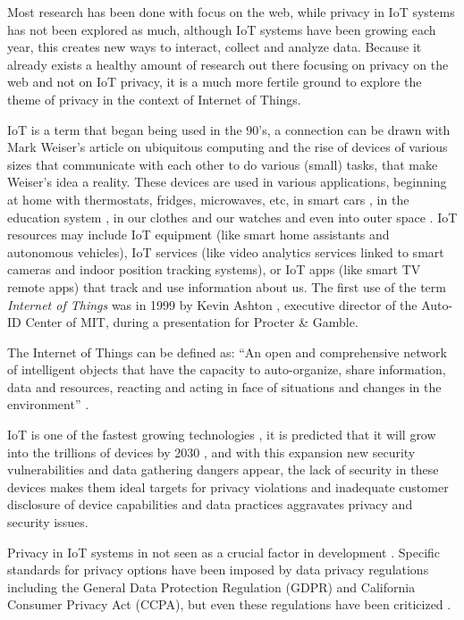 \documentclass[conference]{IEEEtran}
\begin{document}
Most research has been done with focus on the web, while privacy in IoT systems
has not been explored as much, although IoT systems have been growing each
year, this creates new ways to interact, collect and analyze data. Because
it already exists a healthy amount of research out there focusing on privacy
on the web and not on IoT privacy, it is a much more fertile ground to explore
the theme of privacy in the context of Internet of Things.

IoT is a term that began being used in the 90's, a connection can be drawn
with Mark Weiser's article on ubiquitous computing \cite{weiser1991computer}
and the rise of devices of various sizes that communicate with each other to
do various (small) tasks, that make Weiser's idea a reality. These devices are
used in various applications, beginning at home \cite{marikyan2019systematic}
with thermostats, fridges, microwaves, etc, in smart cars \cite{arena2020overview},
in the education system \cite{al2020survey}, in our clothes and our watches \cite{niknejad2020comprehensive}
and even into outer space \cite{AkyildizInternet}. IoT resources may include IoT
equipment (like smart home assistants and autonomous vehicles), IoT services
(like video analytics services linked to smart cameras and indoor position tracking
systems), or IoT apps (like smart TV remote apps) that track and use information
about us. The first use of the term \textit{Internet of Things} was in 1999 by
Kevin Ashton \cite{KevinThat}, executive director of the Auto-ID Center of MIT,
during a presentation for Procter \& Gamble.

The Internet of Things can be defined as: ``An open and comprehensive network
of intelligent objects that have the capacity to auto-organize, share information,
data and resources, reacting and acting in face of situations and changes in
the environment'' \cite{madakam2015internet}.

IoT is one of the fastest growing technologies \cite{MohammadState}, it is predicted
that it will grow into the trillions of devices by 2030 \cite{SarawiInternet},
and with this expansion new security vulnerabilities and data gathering dangers
appear, the lack of security in these devices makes them ideal targets for privacy
violations and inadequate customer disclosure of device capabilities and data
practices aggravates privacy and security issues.

Privacy in IoT systems in not seen as a crucial factor in development \cite{alhirabi2021security}.
Specific standards for privacy options have been imposed by data privacy regulations
including the General Data Protection Regulation (GDPR) and California Consumer
Privacy Act (CCPA), but even these regulations have been criticized \cite{peloquin2020disruptive, gladis2022weaponizing, gentile2022deficient, green2022flaws, byun2019privacy}.
\end{document}
